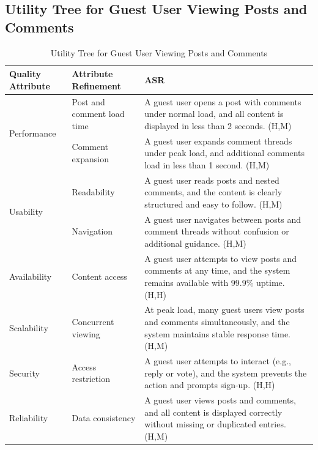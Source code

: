 \documentclass{article}
\begin{document}
\subsection{Utility Tree for Guest User Viewing Posts and Comments}

\begin{table}[H]
\centering
\caption{Utility Tree for Guest User Viewing Posts and Comments}
\begin{tabular}{|p{3cm}|p{4cm}|p{7cm}|}
\hline
\textbf{Quality Attribute} & \textbf{Attribute Refinement} & \textbf{ASR} \\
\hline

\multirow{2}{*}{Performance}
& Post and comment load time
& A guest user opens a post with comments under normal load, and all content is displayed in less than 2 seconds. (H,M) \\
\cline{2-3}
& Comment expansion
& A guest user expands comment threads under peak load, and additional comments load in less than 1 second. (H,M) \\
\hline

\multirow{2}{*}{Usability}
& Readability
& A guest user reads posts and nested comments, and the content is clearly structured and easy to follow. (H,M) \\
\cline{2-3}
& Navigation
& A guest user navigates between posts and comment threads without confusion or additional guidance. (H,M) \\
\hline

Availability
& Content access
& A guest user attempts to view posts and comments at any time, and the system remains available with 99.9\% uptime. (H,H) \\
\hline

Scalability
& Concurrent viewing
& At peak load, many guest users view posts and comments simultaneously, and the system maintains stable response time. (H,M) \\
\hline

Security
& Access restriction
& A guest user attempts to interact (e.g., reply or vote), and the system prevents the action and prompts sign-up. (H,H) \\
\hline

Reliability
& Data consistency
& A guest user views posts and comments, and all content is displayed correctly without missing or duplicated entries. (H,M) \\
\hline

\end{tabular}
\end{table}
\end{document}
